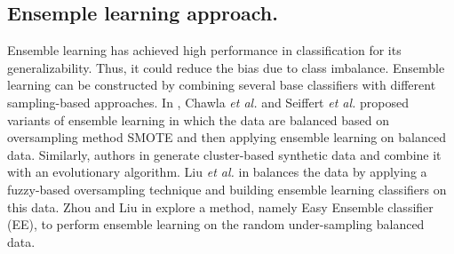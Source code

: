 \subsection{Ensemple learning approach.}
Ensemble learning has achieved high performance in classification for its generalizability. Thus, it could reduce the bias due to class imbalance. Ensemble learning can be constructed by combining several base classifiers with different sampling-based approaches. In \cite{SMOTEBoost, RUSBoost}, Chawla \textit{et al.} and Seiffert \textit{et al.} proposed variants of ensemble learning in which the data are balanced based on oversampling method SMOTE and then applying ensemble learning on balanced data. Similarly, authors in \cite{ECOEnsemble} generate cluster-based synthetic data and combine it with an evolutionary algorithm. Liu \textit{et al.} in \cite{LIU201735} balances the data by applying a fuzzy-based oversampling technique and building ensemble learning classifiers on this data. Zhou and Liu in \cite{EE} explore a method, namely Easy Ensemble classifier (EE), to perform ensemble learning on the random under-sampling balanced data.
     
